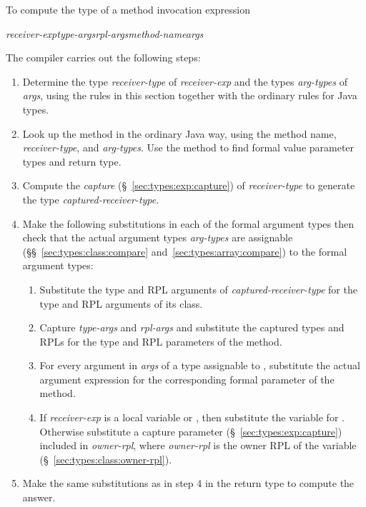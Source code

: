   To compute the type of a
method invocation expression
%
\begin{description}
\item \emph{receiver-exp}\emph{type-args}\kwd{,}\emph{rpl-args}\kwd{>}\emph{method-name}\kwd{(}\emph{args}\kwd{)}
\end{description}
%
The compiler carries out the following steps:
%
\begin{enumerate}
%
\item Determine the type \emph{receiver-type} of \emph{receiver-exp}
  and the types \emph{arg-types} of \emph{args}, using the rules in
  this section together with the ordinary rules for Java types.
%
\item Look up the method in the ordinary Java way, using the method
  name, \emph{receiver-type}, and \emph{arg-types}.  Use the method to
  find formal value parameter types and return type.
%
\item Compute the \emph{capture} (\S~\ref{sec:types:exp:capture}) of
  \emph{receiver-type} to generate the type
  \emph{captured-receiver-type}.
%
\item Make the following substitutions in each of the formal argument
  types then check that the actual argument types \emph{arg-types} are
  assignable (\S\S~\ref{sec:types:class:compare}
  and~\ref{sec:types:array:compare}) to the formal argument types:
%
\begin{enumerate}
%
\item Substitute the type and RPL arguments of
  \emph{captured-receiver-type} for the type and RPL arguments of its
  class.
\item Capture \emph{type-args} and \emph{rpl-args} and substitute the
  captured types and RPLs for the type and RPL parameters of the
  method.
\item For every argument in \emph{args} of a type assignable to
  , substitute the actual argument expression for the
  corresponding formal parameter of the method.
\item If \emph{receiver-exp} is a  local variable or
  , then substitute the variable for .  Otherwise
  substitute a capture parameter (\S~\ref{sec:types:exp:capture})
  included in \emph{owner-rpl}\kwd{:*}, where \emph{owner-rpl} is the
  owner RPL of the variable (\S~\ref{sec:types:class:owner-rpl}).
%
\end{enumerate}
%
\item Make the same substitutions as in step 4 in the return type to
  compute the answer.
%
\end{enumerate}

